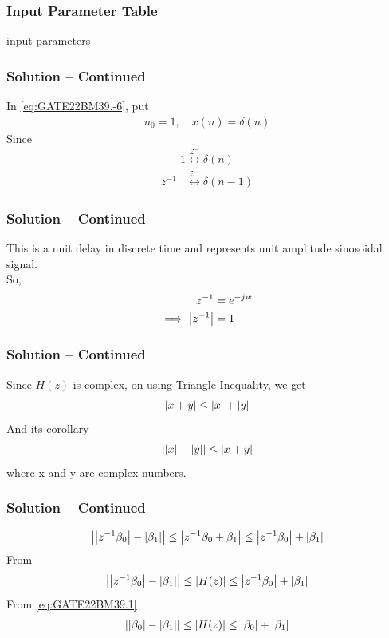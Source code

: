\documentclass{beamer}
\begin{document}
\begin{frame}
\frametitle{Input Parameter Table}
\begin{table}[h]
    \centering
        
    \caption{input parameters}
    \label{tab:GATE22BM39.1}
\end{table}
\end{frame}

\begin{frame}
\frametitle{Solution -- Continued}
In \eqref{eq:GATE22BM39.-6}, put
\begin{align}
n_0 = 1, \quad x(n) = \delta(n) \nonumber 
\end{align}
Since
\begin{align}
1 \overset{\mathcal{Z^{-}}}{\longleftrightarrow} \delta(n) \nonumber
\end{align}
\begin{align}
z^{-1} &\overset{\mathcal{Z^{-}}}{\longleftrightarrow} \delta(n-1)
\end{align}
\end{frame}

\begin{frame}
\frametitle{Solution -- Continued}
This is a unit delay in discrete time and represents unit amplitude sinosoidal signal.\\
So,
\begin{align}
z^{-1} &= e^{-jw} \\\implies
\left\vert z^{-1}\right\vert &= 1 \label{eq:GATE22BM39.1}
\end{align}
\end{frame}

\begin{frame}
\frametitle{Solution -- Continued}
Since $H(z)$ is complex, on using Triangle Inequality, we get
\begin{align}
\left\vert x + y\right\vert \leq \left\vert x\right\vert + \left\vert y\right\vert 
\end{align}
And its corollary
\begin{align}
\left\vert\left\vert x\right\vert-\left\vert y\right\vert\right\vert \leq \left\vert x + y\right\vert
\end{align}
where x and y are complex numbers.
\end{frame}

\begin{frame}
\frametitle{Solution  -- Continued}
\begin{align}
\left\vert\left\vert z^{-1}\beta_0\right\vert-\left\vert\beta_1\right\vert\right\vert \leq \left\vert z^{-1}\beta_0 + \beta_1\right\vert \leq \left\vert z^{-1}\beta_0\right\vert + \left\vert\beta_1\right\vert 
\end{align}
From 
\begin{align}
\left\vert\left\vert z^{-1}\beta_0\right\vert-\left\vert\beta_1\right\vert\right\vert \leq \left\vert H(z)\right\vert \leq \left\vert z^{-1}\beta_0\right\vert + \left\vert\beta_1\right\vert
\end{align}
From \eqref{eq:GATE22BM39.1} 
\begin{align}
\left\vert\left\vert\beta_0\right\vert-\left\vert\beta_1\right\vert\right\vert \leq \left\vert H(z)\right\vert \leq \left\vert\beta_0\right\vert + \left\vert\beta_1\right\vert 
\end{align}
\end{frame}
\end{document}
